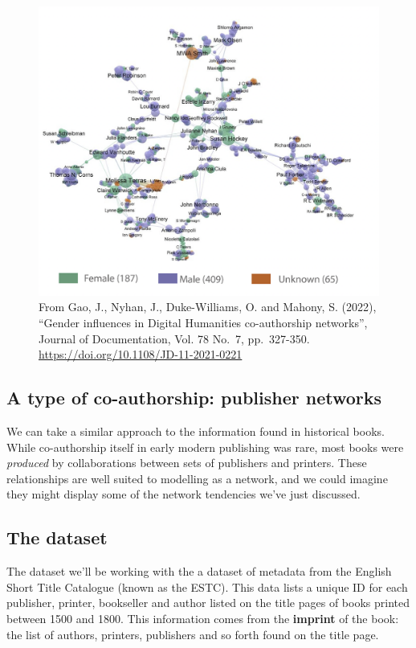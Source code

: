 \documentclass[
]{book}
\begin{document}
\begin{figure}
\centering
\includegraphics[width=6.25in,height=\textheight]{images/co-authorship.png}
\caption{From Gao, J., Nyhan, J., Duke-Williams, O. and Mahony, S. (2022), ``Gender influences in Digital Humanities co-authorship networks'', Journal of Documentation, Vol. 78 No.~7, pp.~327-350. \url{https://doi.org/10.1108/JD-11-2021-0221}}
\end{figure}

\hypertarget{a-type-of-co-authorship-publisher-networks}{%
\subsection{A type of co-authorship: publisher networks}\label{a-type-of-co-authorship-publisher-networks}}

We can take a similar approach to the information found in historical books. While co-authorship itself in early modern publishing was rare, most books were \emph{produced} by collaborations between sets of publishers and printers. These relationships are well suited to modelling as a network, and we could imagine they might display some of the network tendencies we've just discussed.

\hypertarget{the-dataset}{%
\subsection{The dataset}\label{the-dataset}}

The dataset we'll be working with the a dataset of metadata from the English Short Title Catalogue (known as the ESTC). This data lists a unique ID for each publisher, printer, bookseller and author listed on the title pages of books printed between 1500 and 1800. This information comes from the \textbf{imprint} of the book: the list of authors, printers, publishers and so forth found on the title page.
\end{document}
